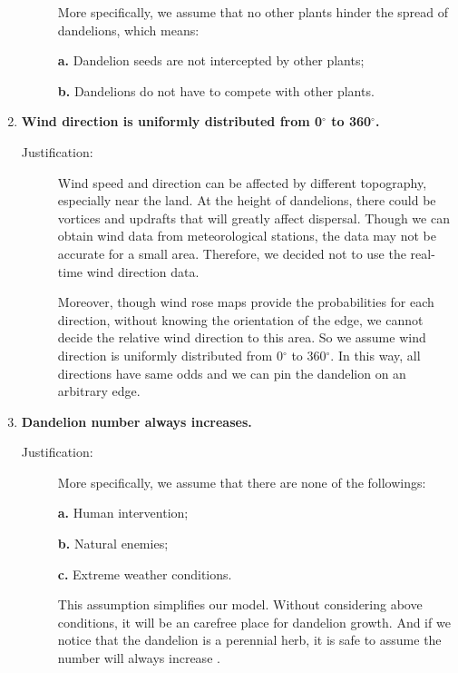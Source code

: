 \documentclass[12pt]{article}
\begin{document}
\begin{enumerate}
\begin{description}
				More specifically, we assume that no other plants hinder the spread of dandelions, which means:
				
				\textbf{a.} Dandelion seeds are not intercepted by other plants;
				
				\textbf{b.} Dandelions do not have to compete with other plants.  
				
			\end{description}
			
			\item \textbf{Wind direction is uniformly distributed from 0$^\circ$ to 360$^\circ$.}
			\vspace{-0.125in}
			\begin{description}
				\item[Justification:] \label{assumption:wind} Wind speed and direction can be affected by different topography, especially near the land. At the height of dandelions, there could be vortices and updrafts that will greatly affect dispersal.  Though we can obtain wind data from meteorological stations, the data may not be accurate for a  small area. Therefore, we decided not to use the real-time wind direction data.
				
				Moreover, though wind rose maps provide the probabilities for each direction, without knowing the orientation of the edge, we cannot decide the relative wind direction to this area.  So we assume wind direction is uniformly distributed from 0$^\circ$ to 360$^\circ$. In this way, all directions have same odds and we can pin the dandelion on an arbitrary edge.
			\end{description}
			
			\item \textbf{Dandelion number always increases.}
			\vspace{-0.125in}
			\begin{description}
				\item[Justification:] More specifically, we assume that there are none of the followings:
				 
				 \textbf{a.} Human intervention;
				 
				 \textbf{b.} Natural enemies;
				 
				 \textbf{c.} Extreme weather conditions.
				
				This assumption simplifies our model.  Without considering above conditions, it will be an carefree place for dandelion growth.  And if we notice that the dandelion is a perennial herb, it is safe to assume the number will always increase .
			\end{description}
			
		\end{enumerate}
		
\end{document}

